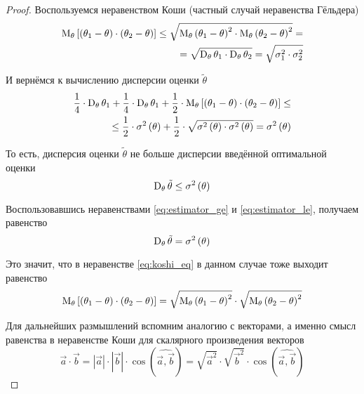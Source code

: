 \begin{proof}
    Воспользуемся неравенством Коши (частный случай неравенства Гёльдера)
    \begin{eqnarray}\label{eq:koshi_eq}
        \operatorname{M}_{\theta} \left[ \left( \theta_1-\theta \right)
            \cdot\left( \theta_2-\theta \right) \right]
        \le\sqrt{\operatorname{M}_{\theta} \left( \theta_1-\theta \right)^2
            \cdot\operatorname{M}_{\theta} \left( \theta_2-\theta \right)^2}=\\
        =\sqrt{\operatorname{D}_{\theta} \theta_1
            \cdot\operatorname{D}_{\theta} \theta_2}
        =\sqrt{\sigma_1^2\cdot\sigma_2^2}\nonumber
    \end{eqnarray}
    
    И вернёмся к вычислению дисперсии оценки $\tilde{\theta}$
    \begin{align*}
        \frac{1}{4}\cdot\operatorname{D}_{\theta} \theta_1
            +\frac{1}{4}\cdot\operatorname{D}_{\theta} \theta_1
            +\frac{1}{2}\cdot\operatorname{M}_{\theta} \left[ \left( \theta_1-\theta \right)
                    \cdot\left( \theta_2-\theta \right) \right]\le\\
        \le\frac{1}{2}\cdot\sigma^2\left( \theta \right)
            +\frac{1}{2}\cdot\sqrt{\sigma^2\left( \theta \right)
                \cdot\sigma^2\left( \theta \right)}
        =\sigma^2\left( \theta \right)
    \end{align*}

    То есть, дисперсия оценки $\tilde{\theta}$ не больше дисперсии
    введённой оптимальной оценки
    \begin{equation}\label{eq:estimator_le}
        \operatorname{D}_{\theta} \tilde{\theta}\le\sigma^2\left(\theta\right)
    \end{equation}

    Воспользовавшись неравенствами
    \eqref{eq:estimator_ge} и \eqref{eq:estimator_le}, получаем равенство
    $$\operatorname{D}_{\theta} \tilde{\theta}=\sigma^2\left(\theta\right)$$

    Это значит, что в неравенстве \eqref{eq:koshi_eq}
    в данном случае тоже выходит равенство
    $$\operatorname{M}_{\theta} \left[ \left( \theta_1-\theta \right)
            \cdot\left( \theta_2-\theta \right) \right]
        =\sqrt{\operatorname{M}_{\theta} \left( \theta_1-\theta \right)^2}
            \cdot\sqrt{\operatorname{M}_{\theta} \left( \theta_2-\theta \right)^2}$$

    Для дальнейших размышлений вспомним аналогию с векторами,
    а именно смысл равенства в неравенстве Коши
    для скалярного произведения векторов
    $$\vec{a}\cdot\vec{b}
        =\left|\vec{a}\right|\cdot\left|\vec{b}\right|
            \cdot\cos{\left(\widehat{\vec{a},\vec{b}}\right)}
        =\sqrt{\vec{a}^2}\cdot\sqrt{\vec{b}^2}
            \cdot\cos{\left(\widehat{\vec{a},\vec{b}}\right)}$$


\end{proof}
